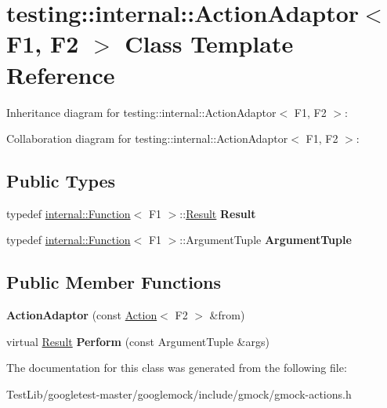 \hypertarget{classtesting_1_1internal_1_1ActionAdaptor}{}\section{testing\+:\+:internal\+:\+:Action\+Adaptor$<$ F1, F2 $>$ Class Template Reference}
\label{classtesting_1_1internal_1_1ActionAdaptor}


Inheritance diagram for testing\+:\+:internal\+:\+:Action\+Adaptor$<$ F1, F2 $>$\+:


Collaboration diagram for testing\+:\+:internal\+:\+:Action\+Adaptor$<$ F1, F2 $>$\+:
\subsection*{Public Types}
\begin{DoxyCompactItemize}
\item 
\mbox{\label{classtesting_1_1internal_1_1ActionAdaptor_afa8f7872b6db3d8f1545fd98b45b0b95}} 
typedef \hyperlink{structtesting_1_1internal_1_1Function}{internal\+::\+Function}$<$ F1 $>$\+::\hyperlink{classResult}{Result} {\bfseries Result}
\item 
\mbox{\label{classtesting_1_1internal_1_1ActionAdaptor_a4f78fb73f97b72fea8a93b78a8ab5704}} 
typedef \hyperlink{structtesting_1_1internal_1_1Function}{internal\+::\+Function}$<$ F1 $>$\+::Argument\+Tuple {\bfseries Argument\+Tuple}
\end{DoxyCompactItemize}
\subsection*{Public Member Functions}
\begin{DoxyCompactItemize}
\item 
\mbox{\label{classtesting_1_1internal_1_1ActionAdaptor_a24ba3330ef3cc365b956c50ec73e4177}} 
{\bfseries Action\+Adaptor} (const \hyperlink{classtesting_1_1Action}{Action}$<$ F2 $>$ \&from)
\item 
\mbox{\label{classtesting_1_1internal_1_1ActionAdaptor_a8d8a47a31f068cf6e0c95b91605d5540}} 
virtual \hyperlink{classResult}{Result} {\bfseries Perform} (const Argument\+Tuple \&args)
\end{DoxyCompactItemize}


The documentation for this class was generated from the following file\+:\begin{DoxyCompactItemize}
\item 
Test\+Lib/googletest-\/master/googlemock/include/gmock/gmock-\/actions.\+h\end{DoxyCompactItemize}

